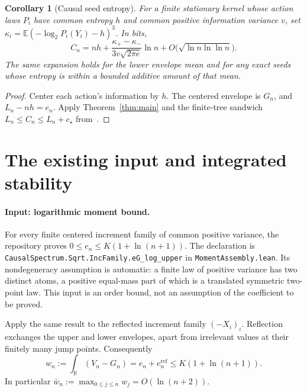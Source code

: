\documentclass[11pt]{article}
\newtheorem{corollary}[theorem]{Corollary}
\newcommand{\E}{\mathbb E}
\newcommand{\R}{\mathbb R}
\begin{document}
\begin{corollary}[Causal seed entropy]\label{cor:cost}
For a finite stationary kernel whose action laws $P_i$ have common
entropy $h$ and common positive information variance $v$, set
$\kappa_i=\E(-\log_2P_i(Y_i)-h)^3$. In bits,
\[
 \boxed{C_n=nh+
 \frac{\kappa_+-\kappa_-}{3v\sqrt{2\pi e}}\ln n
 +O\bigl(\sqrt{\ln n\ln\ln n}\bigr).}
\]
The same expansion holds for the lower envelope mean and for any exact
seeds whose entropy is within a bounded additive amount of that mean.
\end{corollary}
\begin{proof}
Center each action's information by $h$. The centered envelope is $G_n$,
and $L_n-nh=e_n$. Apply Theorem~\ref{thm:main} and the finite-tree
sandwich $L_n\le C_n\le L_n+c_\star$ from~\cite{repo}.
\end{proof}

\section{The existing input and integrated stability}
\paragraph{Input: logarithmic moment bound.}
For every finite centered increment family of common positive variance,
the repository proves $0\le e_n\le K(1+\ln(n+1))$.
The declaration is
\texttt{CausalSpectrum.Sqrt.IncFamily.eG\_log\_upper} in
\texttt{MomentAssembly.lean}. Its nondegeneracy assumption is automatic:
a finite law of positive variance has two distinct atoms, a positive
equal-mass part of which is a translated symmetric two-point law.
This input is an order bound, not an assumption of the coefficient to be proved.

Apply the same result to the reflected increment family $(-X_i)_i$.
Reflection exchanges the upper and lower envelopes, apart from irrelevant
values at their finitely many jump points. Consequently
\begin{equation}\label{eq:width}
 w_n:=\int_\R(V_n-G_n)=e_n+e_n^{\mathrm{ref}}
 \le K(1+\ln(n+1)).
\end{equation}
In particular $\bar w_n:=\max_{0\le j\le n}w_j=O(\ln(n+2))$.
\end{document}
